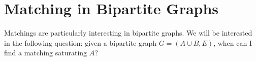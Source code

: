 \documentclass[a4paper]{scrreprt}
\begin{document}
\section{Matching in Bipartite Graphs}

Matchings are particularly interesting in bipartite graphs. We will be interested in the following question: given a bipartite graph $G = (A \cup B, E)$, when can I find a matching saturating $A$?

\begin{center}
	


\begin{tikzpicture}[x=0.75pt,y=0.75pt,yscale=-1,xscale=1]


\end{tikzpicture}
\end{center}
\end{document}
